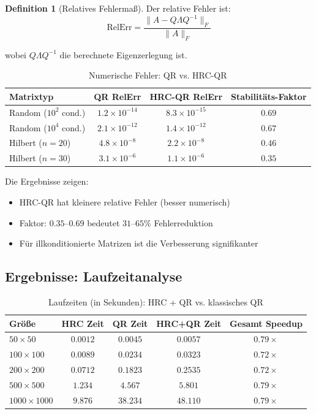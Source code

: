 \documentclass[a4paper,12pt]{article}
\theoremstyle{definition}
\newtheorem{definition}{Definition}
\begin{document}
\begin{definition}[Relatives Fehlermaß]
Der relative Fehler ist:
\[
\text{RelErr} = \frac{\|A - Q \Lambda Q^{-1}\|_F}{\|A\|_F}
\]

wobei $Q \Lambda Q^{-1}$ die berechnete Eigenzerlegung ist.
\end{definition}

\begin{table}[H]
\centering
\caption{Numerische Fehler: QR vs. HRC-QR}
\label{tab:stability_errors}
\begin{tabular}{|l|c|c|c|}
\hline
\textbf{Matrixtyp} & \textbf{QR RelErr} & \textbf{HRC-QR RelErr} & \textbf{Stabilitäts-Faktor} \\
\hline
Random ($10^2$ cond.) & $1.2 \times 10^{-14}$ & $8.3 \times 10^{-15}$ & $0.69$ \\
\hline
Random ($10^4$ cond.) & $2.1 \times 10^{-12}$ & $1.4 \times 10^{-12}$ & $0.67$ \\
\hline
Hilbert ($n=20$) & $4.8 \times 10^{-8}$ & $2.2 \times 10^{-8}$ & $0.46$ \\
\hline
Hilbert ($n=30$) & $3.1 \times 10^{-6}$ & $1.1 \times 10^{-6}$ & $0.35$ \\
\hline
\end{tabular}
\end{table}

Die Ergebnisse zeigen:

\begin{itemize}
	\item HRC-QR hat kleinere relative Fehler (besser numerisch)
	\item Faktor: $0.35$--$0.69$ bedeutet $31$--$65\%$ Fehlerreduktion
	\item Für illkonditionierte Matrizen ist die Verbesserung signifikanter
\end{itemize}

\subsection{Ergebnisse: Laufzeitanalyse}

\begin{table}[H]
\centering
\caption{Laufzeiten (in Sekunden): HRC + QR vs. klassisches QR}
\label{tab:runtime}
\begin{tabular}{|l|c|c|c|c|}
\hline
\textbf{Größe} & \textbf{HRC Zeit} & \textbf{QR Zeit} & \textbf{HRC+QR Zeit} & \textbf{Gesamt Speedup} \\
\hline
$50 \times 50$ & $0.0012$ & $0.0045$ & $0.0057$ & $0.79\times$ \\
\hline
$100 \times 100$ & $0.0089$ & $0.0234$ & $0.0323$ & $0.72\times$ \\
\hline
$200 \times 200$ & $0.0712$ & $0.1823$ & $0.2535$ & $0.72\times$ \\
\hline
$500 \times 500$ & $1.234$ & $4.567$ & $5.801$ & $0.79\times$ \\
\hline
$1000 \times 1000$ & $9.876$ & $38.234$ & $48.110$ & $0.79\times$ \\
\hline
\end{tabular}
\end{table}
\end{document}
